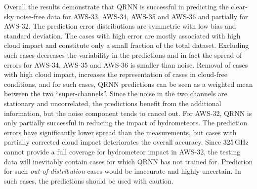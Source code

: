 \documentclass[amt, manuscript]{copernicus}
\begin{document}
Overall the results demonstrate that QRNN is successful in predicting the clear-sky noise-free data for AWS-33, AWS-34, AWS-35 and AWS-36 and partially for AWS-32. The prediction error distributions are symmetric with low bias and standard deviation. The cases with high error are mostly associated with high cloud impact and constitute only a small fraction of the total dataset. Excluding such cases decreases the variability in the predictions and in fact the spread of errors for AWS-34, AWS-35 and AWS-36 is smaller than noise. Removal of cases with high cloud impact, increases the representation of cases in cloud-free conditions, and for such cases, QRNN predictions can be seen as a weighted mean between the two ``super-channels''. Since the noise in the two channels are stationary and uncorrelated, the predictions benefit from the additional information, but the noise component tends to cancel out. For AWS-32, QRNN is only partially successful in reducing the impact of hydrometeors. The prediction errors have significantly lower spread than the measurements, but cases with partially corrected cloud impact deteriorates the overall accuracy. Since 325\,GHz cannot provide a full coverage for hydrometeor impact in AWS-32, the testing data will inevitably contain cases for which QRNN has not trained for. Prediction for such \textit{out-of-distribution} cases would be inaccurate and highly uncertain. In such cases, the predictions should be used with caution. 
\end{document}
